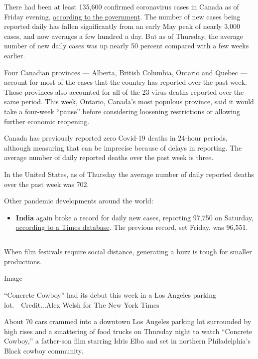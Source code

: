 There had been at least 135,600 confirmed coronavirus cases in Canada as
of Friday evening,
\href{https://www.nytimes3xbfgragh.onion/interactive/2020/world/canada/canada-coronavirus-cases.html}{according
to the government}. The number of new cases being reported daily has
fallen significantly from an early May peak of nearly 3,000 cases, and
now averages a few hundred a day. But as of Thursday, the average number
of new daily cases was up nearly 50 percent compared with a few weeks
earlier.

Four Canadian provinces --- Alberta, British Columbia, Ontario and
Quebec --- account for most of the cases that the country has reported
over the past week. Those provinces also accounted for all of the 23
virus-deaths reported over the same period. This week, Ontario, Canada's
most populous province, said it would take a four-week ``pause'' before
considering loosening restrictions or allowing further economic
reopening.

Canada has previously reported zero Covid-19 deaths in 24-hour periods,
although measuring that can be imprecise because of delays in reporting.
The average number of daily reported deaths over the past week is three.

In the United States, as of Thursday the average number of daily
reported deaths over the past week was 702.

Other pandemic developments around the world:

\begin{itemize}
\tightlist
\item
  \textbf{India} again broke a record for daily new cases, reporting
  97,750 on Saturday,
  \href{https://www.nytimes3xbfgragh.onion/interactive/2020/world/asia/india-coronavirus-cases.html}{according
  to a Times database}. The previous record, set Friday, was 96,551.
\end{itemize}

\hypertarget{-7}{%
\subsection{}\label{-7}}

When film festivals require social distance, generating a buzz is tough
for smaller productions.

Image

``Concrete Cowboy'' had its debut this week in a Los Angeles parking
lot.~~Credit...Alex Welsh for The New York Times

About 70 cars crammed into a downtown Los Angeles parking lot surrounded
by high rises and a smattering of food trucks on Thursday night to watch
``Concrete Cowboy,'' a father-son film starring Idris Elba and set in
northern Philadelphia's Black cowboy community.

